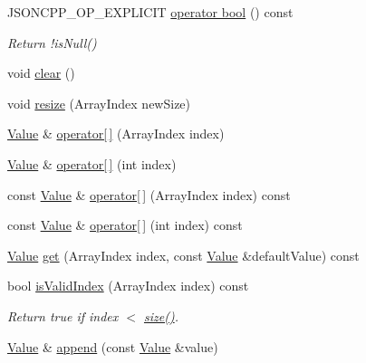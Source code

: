\begin{DoxyCompactItemize}
\mbox{\label{classJson_1_1Value_a2addc2bcedbd6f8a1eafa49e9adcc729}} 
J\+S\+O\+N\+C\+P\+P\+\_\+\+O\+P\+\_\+\+E\+X\+P\+L\+I\+C\+IT \hyperlink{classJson_1_1Value_a2addc2bcedbd6f8a1eafa49e9adcc729}{operator bool} () const
\begin{DoxyCompactList}\small\item\em Return !is\+Null() \end{DoxyCompactList}\item 
void \hyperlink{classJson_1_1Value_a501a4d67e6c875255c2ecc03ccd2019b}{clear} ()
\item 
void \hyperlink{classJson_1_1Value_a7a064d8aa47fde09a268be2aea992134}{resize} (Array\+Index new\+Size)
\item 
\hyperlink{classJson_1_1Value}{Value} \& \hyperlink{classJson_1_1Value_a7d99f5dba388cdaa152ce6ef933d64ef}{operator\mbox{[}$\,$\mbox{]}} (Array\+Index index)
\item 
\hyperlink{classJson_1_1Value}{Value} \& \hyperlink{classJson_1_1Value_ac9182982c361e0ab621134d406e5f250}{operator\mbox{[}$\,$\mbox{]}} (int index)
\item 
const \hyperlink{classJson_1_1Value}{Value} \& \hyperlink{classJson_1_1Value_a46607236038b29695ed80c15895271e4}{operator\mbox{[}$\,$\mbox{]}} (Array\+Index index) const
\item 
const \hyperlink{classJson_1_1Value}{Value} \& \hyperlink{classJson_1_1Value_a0b42557a95621a4676b46a21ffc5e949}{operator\mbox{[}$\,$\mbox{]}} (int index) const
\item 
\hyperlink{classJson_1_1Value}{Value} \hyperlink{classJson_1_1Value_a034eb7bf85a44fa759bdaa232788ca66}{get} (Array\+Index index, const \hyperlink{classJson_1_1Value}{Value} \&default\+Value) const
\item 
\mbox{\label{classJson_1_1Value_ac2928f174a6e081c1500c28c2d61ee93}} 
bool \hyperlink{classJson_1_1Value_ac2928f174a6e081c1500c28c2d61ee93}{is\+Valid\+Index} (Array\+Index index) const
\begin{DoxyCompactList}\small\item\em Return true if index $<$ \hyperlink{classJson_1_1Value_a0ec2808e1d7efa4e9fad938d6667be44}{size()}. \end{DoxyCompactList}\item 
\hyperlink{classJson_1_1Value}{Value} \& \hyperlink{classJson_1_1Value_a7e49ac977e4bcf59745a09d426669f75}{append} (const \hyperlink{classJson_1_1Value}{Value} \&value)

\end{DoxyCompactItemize}
